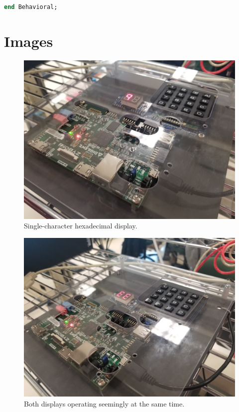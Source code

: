 \documentclass{article}
\begin{document}
\begin{appendices}
\begin{lstlisting}[language=VHDL]
end Behavioral;
\end{lstlisting}

\section{Images}

    \begin{figure}[H]
	\centering
        \includegraphics[width=125mm]{display_single.jpg}
        \caption{Single-character hexadecimal display.}
        \label{fig:display_single}
    \end{figure}

    
    \begin{figure}[H]
	\centering
        \includegraphics[width=125mm]{counter_dual.jpg}
        \caption{Both displays operating seemingly at the same time.}
        \label{fig:counter_dual}
    \end{figure}
\end{appendices}
\end{document}
